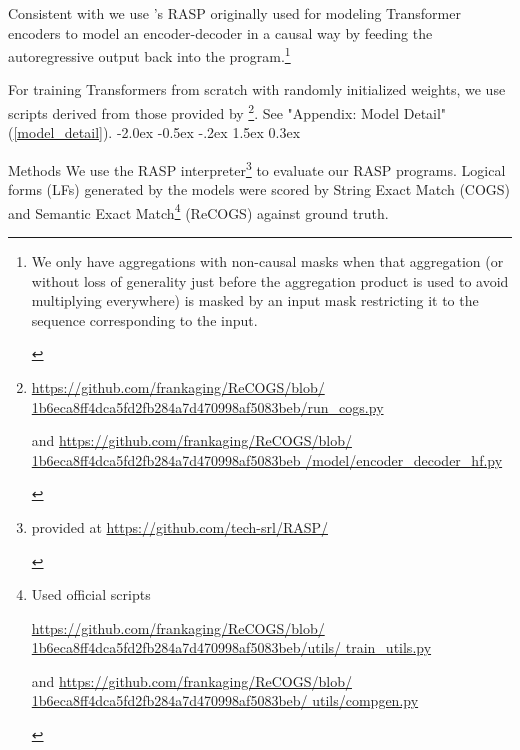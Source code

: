 \documentclass[11pt]{article}
\makeatletter
\renewcommand\section{\@startsection{section}{1}{\z@}%
                                  {-2.0ex \@plus -0.5ex \@minus -.2ex}%
                                  {1.5ex \@plus 0.3ex}%
                                  {\large\bfseries\raggedright}}
\makeatother
\begin{document}
Consistent with \citep{Zhou2024} we use \citep{Weiss2021}'s RASP originally used for modeling Transformer encoders to model an encoder-decoder in a causal way by feeding the autoregressive output back into the program.\footnote{\begin{footnotesize}We only have aggregations with non-causal masks when that aggregation (or without loss of generality just before the aggregation product is used to avoid multiplying everywhere) is masked by an input mask restricting it to the sequence corresponding to the input.\end{footnotesize}}

For training Transformers from scratch with randomly initialized weights, we use scripts derived from those provided by \citep{Wu2023}\footnote{
\begin{footnotesize}\href{https://github.com/frankaging/ReCOGS/blob/1b6eca8ff4dca5fd2fb284a7d470998af5083beb/run\_cogs.py}{https://github.com/frankaging/ReCOGS/blob/
1b6eca8ff4dca5fd2fb284a7d470998af5083beb/run\_cogs.py}

and \href{https://github.com/frankaging/ReCOGS/blob/1b6eca8ff4dca5fd2fb284a7d470998af5083beb/model/encoder\_decoder\_hf.py}{https://github.com/frankaging/ReCOGS/blob/
1b6eca8ff4dca5fd2fb284a7d470998af5083beb
/model/encoder\_decoder\_hf.py} 
\end{footnotesize}
}. See "Appendix: Model Detail" (\ref{model_detail}).
\section{Methods}
We use the RASP \citep{Weiss2021} interpreter\footnote{\begin{footnotesize}provided at \href{https://github.com/tech-srl/RASP/}{https://github.com/tech-srl/RASP/}
\end{footnotesize}
} to evaluate our RASP programs. Logical forms (LFs) generated by the models were scored by String Exact Match (COGS) and Semantic Exact Match\footnote{\begin{footnotesize}Used official scripts

\href{https://github.com/frankaging/ReCOGS/blob/1b6eca8ff4dca5fd2fb284a7d470998af5083beb/utils/train\_utils.py}{https://github.com/frankaging/ReCOGS/blob/
1b6eca8ff4dca5fd2fb284a7d470998af5083beb/utils/
train\_utils.py} 

and \href{https://github.com/frankaging/ReCOGS/blob/1b6eca8ff4dca5fd2fb284a7d470998af5083beb/utils/compgen.py}{https://github.com/frankaging/ReCOGS/blob/
1b6eca8ff4dca5fd2fb284a7d470998af5083beb/
utils/compgen.py}
\end{footnotesize}
} (ReCOGS) against ground truth.%
\end{document}

